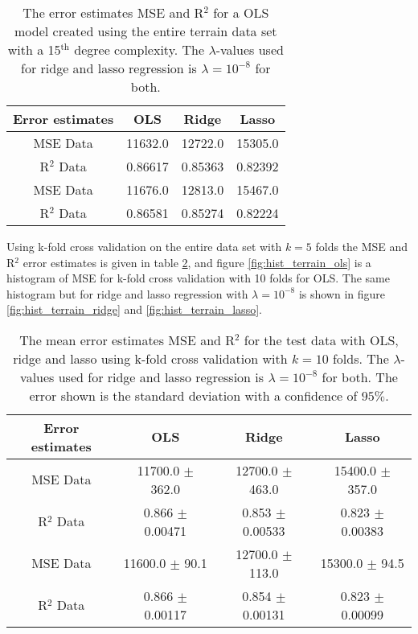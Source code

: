 \documentclass[uio,jmp,amsmath,amssymb,reprint,nofootinbib]{revtex4-1}
\numberwithin{equation}{section}
\begin{document}
\begin{table}
\begin{tabular}{|c|c|c|c|}\hline
Error estimates & OLS & Ridge & Lasso\\ \hline
MSE Data & 11632.0 & 12722.0 & 15305.0 \\ \hline
R\(^2\) Data & 0.86617 & 0.85363 & 0.82392 \\ \hline
MSE Data & 11676.0 & 12813.0 & 15467.0 \\ \hline
R\(^2\) Data & 0.86581 & 0.85274 & 0.82224 \\ \hline
\end{tabular}
\caption{The error estimates MSE and R\(^2\) for a OLS model created using the entire terrain data set with a 15\(^\text{th}\) degree complexity. The \(\lambda\)-values used for ridge and lasso regression is \(\lambda = 10^{-8}\) for both.}
\label{tab:11}
\end{table}

Using k-fold cross validation on the entire data set with \(k=5\) folds the MSE and R\(^2\) error estimates is given in table \ref{tab:12}, and figure \ref{fig:hist_terrain_ols} is a histogram of MSE for k-fold cross validation with 10 folds for OLS. The same histogram but for ridge and lasso regression with \(\lambda = 10^{-8}\) is shown in figure \ref{fig:hist_terrain_ridge} and \ref{fig:hist_terrain_lasso}.

\begin{table}
\begin{tabular}{|c|c|c|c|}\hline
Error estimates & OLS & Ridge & Lasso\\ \hline
MSE Data & 11700.0 \(\pm\) 362.0 & 12700.0 \(\pm\) 463.0 & 15400.0 \(\pm\) 357.0 \\ \hline
R\(^2\) Data & 0.866 \(\pm\) 0.00471 & 0.853 \(\pm\) 0.00533 & 0.823 \(\pm\) 0.00383 \\ \hline
MSE Data & 11600.0 \(\pm\) 90.1 & 12700.0 \(\pm\) 113.0 & 15300.0 \(\pm\) 94.5 \\ \hline
R\(^2\) Data & 0.866 \(\pm\) 0.00117 & 0.854 \(\pm\) 0.00131 & 0.823 \(\pm\) 0.00099 \\ \hline
\end{tabular}
\caption{The mean error estimates MSE and R\(^2\) for the test data with OLS, ridge and lasso using k-fold cross validation with \(k=10\) folds. The \(\lambda\)-values used for ridge and lasso regression is \(\lambda = 10^{-8}\) for both. The error shown is the standard deviation with a confidence of \(95\%\).}
\label{tab:12}
\end{table}
\end{document}
